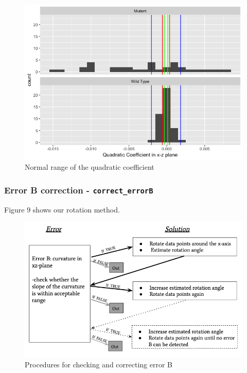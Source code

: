 \documentclass[10pt,letterpaper]{article}
\begin{document}
\begin{figure}[H]
\includegraphics[width=0.9\linewidth]{visualization_paper/range_for_is_errorB} \caption{Normal range of the quadratic coefficient}\label{fig:Figure8}
\end{figure}

\hypertarget{error-b-correction---correct_errorb}{%
\subsubsection{\texorpdfstring{Error B correction -
\texttt{correct\_errorB}}{Error B correction - correct\_errorB}}\label{error-b-correction---correct_errorb}}

Figure 9 shows our rotation method.

\begin{figure}[H]
\includegraphics[width=0.9\linewidth]{visualization_paper/diagram_2errors} \caption{Procedures for checking and correcting error B}\label{fig:Figure9}
\end{figure}
\end{document}
